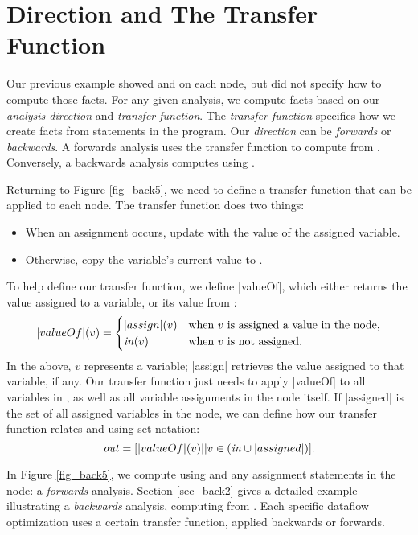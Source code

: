 \documentclass[12pt]{report}
\begin{document}
\section{Direction and The Transfer Function}
\label{sec_back5}
Our previous example showed \inE and \out on each
node, but did not specify how to compute those facts. For any given
analysis, we compute facts based on our \emph{analysis direction} and
\emph{transfer function}. The \emph{transfer function} specifies how we 
create facts from statements in the program. Our \emph{direction} can 
be \emph{forwards} or \emph{backwards}. A forwards analysis uses 
the transfer function to compute \out from \inE. Conversely,
a backwards analysis computes \inE using \out. 

Returning to Figure \ref{fig_back5}, we need to define a transfer
function that can be applied to each node. The transfer function does
two things:
\begin{itemize}
\item When an assignment occurs, update \out with the value of the assigned variable.
\item Otherwise, copy the variable's current value to \out.
\end{itemize}
To help define our transfer function, we define |valueOf|,
which either returns the value assigned to a variable, or its value
from \inE:
\begin{equation} |valueOf|(v) = 
  \begin{cases}
    |assign|(v) & \text{when $v$ is assigned a value in the node,} \\
    \text{\emph{in}}(v) & \text{when $v$ is not assigned.} 
  \end{cases}
\label{eqn_back2}
\end{equation}
In the above, $v$ represents a variable; |assign| retrieves the value
assigned to that variable, if any.  Our transfer function just needs
to apply |valueOf| to all variables in \inE, as well as all
variable assignments in the node itself. If |assigned| is the set of
all assigned variables in the node, we can define how our transfer
function relates \inE and \out using set notation:
\begin{equation}
  \text{\emph{out}} = [|valueOf|(v) || v \in (\text{\emph{in}} \cup |assigned|)].
\end{equation}

In Figure \ref{fig_back5}, we compute \out using \inE and any
assignment statements in the node: a \emph{forwards} analysis. Section
\ref{sec_back2} gives a detailed example illustrating a
\emph{backwards} analysis, computing \inE from \out. Each specific
dataflow optimization uses a certain transfer function, applied
backwards or forwards.
\end{document}
